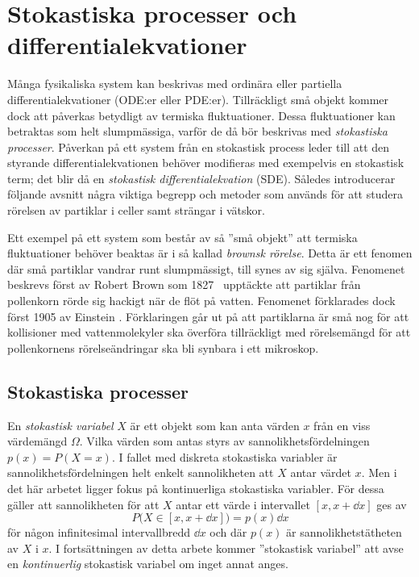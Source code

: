 \chapter{Stokastiska processer och differentialekvationer}

Många fysikaliska system kan beskrivas med ordinära eller partiella differential\-ekvationer (ODE:er
eller PDE:er). Tillräckligt små objekt kommer dock att påverkas betydligt av termiska fluktuationer. Dessa fluktuationer kan betraktas som helt slumpmässiga, varför de då bör beskrivas med \emph{stokastiska processer}. Påverkan på ett system från en stokastisk process leder till att den styrande differentialekvationen behöver modifieras med exempelvis en stokastisk term; det blir då en \emph{stokastisk differentialekvation} (SDE).  Således introducerar följande avsnitt några viktiga begrepp och metoder som används för att studera rörelsen av partiklar i celler samt strängar i vätskor. 

Ett exempel på ett system som består av så ''små objekt'' att termiska
fluktuationer behöver beaktas är i så kallad \emph{brownsk rörelse}. 
Detta är ett fenomen där små partiklar vandrar runt slumpmässigt, till synes av sig själva. Fenomenet beskrevs först av Robert Brown som 1827~\cite{Brown1828} upptäckte att partiklar från pollenkorn rörde sig hackigt när de flöt på vatten. Fenomenet förklarades dock först 1905 av Einstein \cite{Einstein1905}. Förklaringen går ut på att partiklarna är små nog för att kollisioner med vattenmolekyler ska överföra tillräckligt med rörelsemängd för att pollenkornens rörelseändringar ska bli synbara i ett mikroskop. 


\section{Stokastiska processer}
En \emph{stokastisk variabel} $X$ är ett objekt som kan anta värden
$x$ från en viss värdemängd $\Omega$. Vilka värden som antas styrs av
sannolikhetsfördelningen $p(x)=P(X=x)$. I fallet med diskreta stokastiska
variabler är sannolikhetsfördelningen helt enkelt sannolikheten att
$X$ antar värdet $x$. Men i det här arbetet ligger fokus på
kontinuerliga stokastiska variabler. För dessa gäller att sannolikheten för att $X$ antar ett värde i intervallet $[x, x+\dd{x}]$ ges av
\begin{equation}
P\big( X\in[x, x+\dd{x}] \big) =p(x)\dd{x}
\end{equation}
för någon infinitesimal intervallbredd $\dd{x}$ och där $p(x)$ är sannolikhetstätheten av $X$ i $x$. 
I fortsättningen av detta arbete kommer ''stokastisk variabel'' att avse en \emph{kontinuerlig} stokastisk variabel om inget annat anges.


